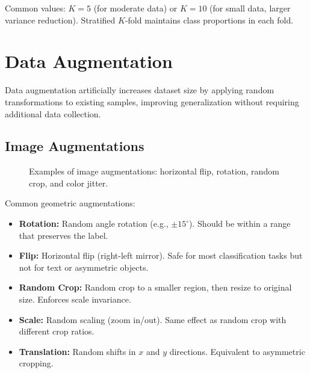 Common values: $K = 5$ (for moderate data) or $K = 10$ (for small data, larger variance reduction). Stratified $K$-fold maintains class proportions in each fold.

\section{Data Augmentation}

Data augmentation artificially increases dataset size by applying random transformations to existing samples, improving generalization without requiring additional data collection.

\subsection{Image Augmentations}

\begin{figure}[htbp]
    \centering
    \caption{Examples of image augmentations: horizontal flip, rotation, random crop, and color jitter.}
    \label{fig:augmentation}
\end{figure}

Common geometric augmentations:
\begin{itemize}
    \item \textbf{Rotation:} Random angle rotation (e.g., $\pm 15^\circ$). Should be within a range that preserves the label.
    \item \textbf{Flip:} Horizontal flip (right-left mirror). Safe for most classification tasks but not for text or asymmetric objects.
    \item \textbf{Random Crop:} Random crop to a smaller region, then resize to original size. Enforces scale invariance.
    \item \textbf{Scale:} Random scaling (zoom in/out). Same effect as random crop with different crop ratios.
    \item \textbf{Translation:} Random shifts in $x$ and $y$ directions. Equivalent to asymmetric cropping.
\end{itemize}

